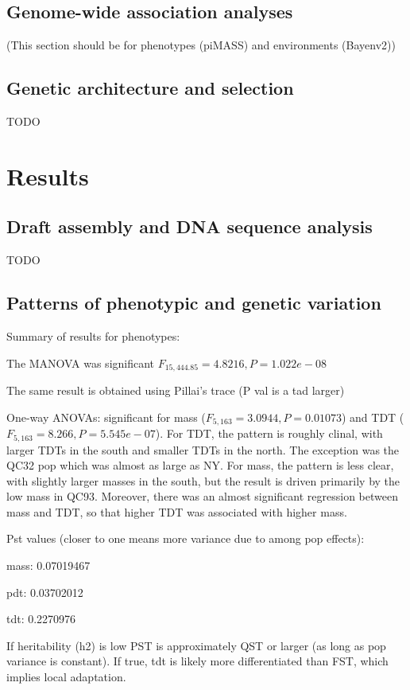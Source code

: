 \documentclass[fleqn,11pt]{wlpeerj}
\begin{document}
\subsection*{Genome-wide association analyses}
(This section should be for phenotypes (piMASS) and environments (Bayenv2))

\subsection*{Genetic architecture and selection}
TODO

\section*{Results}

\subsection*{Draft assembly and DNA sequence analysis}
TODO

\subsection*{Patterns of phenotypic and genetic variation}
Summary of results for phenotypes: 

The MANOVA was significant $F_{15,444.85} = 4.8216, P = 1.022e-08$

The same result is obtained using Pillai's trace (P val is a tad larger)

One-way ANOVAs: significant for mass ($F_{5,163} = 3.0944, P = 0.01073$) 
and TDT ($F_{5,163} = 8.266, P = 5.545e-07$). For TDT, the pattern is 
roughly clinal, with larger TDTs in the south and smaller TDTs in the north. 
The exception was the QC32 pop which was almost as large as NY. 
For mass, the pattern is less clear, with slightly larger masses in the south, 
but the result is driven primarily by the low mass in QC93. Moreover, there was
an almost significant regression between mass and TDT, so
that higher TDT was associated with higher mass. 

Pst values (closer to one means more variance due to among pop effects):

mass: 0.07019467

pdt: 0.03702012

tdt: 0.2270976

If heritability (h2) is low PST is approximately QST or larger (as long as pop variance is constant).
If true, tdt is likely more differentiated than FST, which implies local adaptation.
\end{document}
